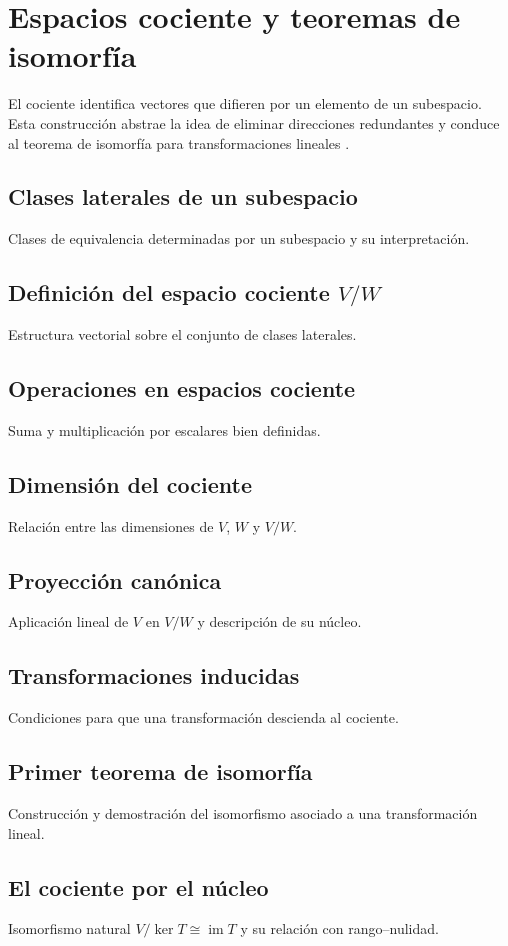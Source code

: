 \chapter{Espacios cociente y teoremas de isomorfía}
\label{cap:cocientes-isomorfia}

El cociente identifica vectores que difieren por un elemento de un subespacio. Esta construcción abstrae la idea de eliminar direcciones redundantes y conduce al teorema de isomorfía para transformaciones lineales \cite{lang1987,hoffmankunze1971,axler2024}.

\section{Clases laterales de un subespacio}
Clases de equivalencia determinadas por un subespacio y su interpretación.

\section{Definición del espacio cociente \texorpdfstring{$V/W$}{V/W}}
Estructura vectorial sobre el conjunto de clases laterales.

\section{Operaciones en espacios cociente}
Suma y multiplicación por escalares bien definidas.

\section{Dimensión del cociente}
Relación entre las dimensiones de $V$, $W$ y $V/W$.

\section{Proyección canónica}
Aplicación lineal de $V$ en $V/W$ y descripción de su núcleo.

\section{Transformaciones inducidas}
Condiciones para que una transformación descienda al cociente.

\section{Primer teorema de isomorfía}
Construcción y demostración del isomorfismo asociado a una transformación lineal.

\section{El cociente por el núcleo}
Isomorfismo natural $V/\ker T\cong\operatorname{im}T$ y su relación con rango--nulidad.
